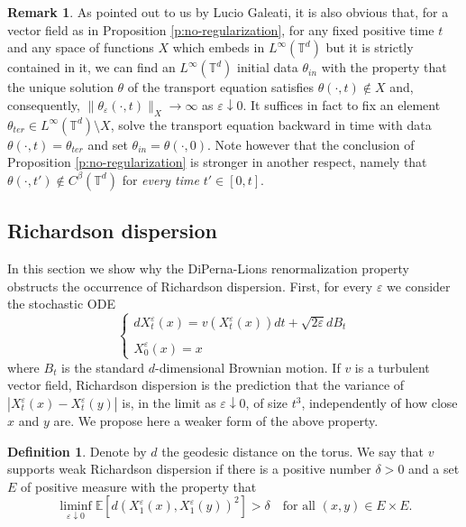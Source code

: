 \documentclass[11pt,reqno]{amsart}
\theoremstyle{definition}
\newtheorem{definition}[theorem]{Definition}
\newtheorem{remark}[theorem]{Remark}
\numberwithin{equation}{section}
\begin{document}
\begin{remark}
As pointed out to us by Lucio Galeati, it is also obvious that, for a vector field as in Proposition \ref{p:no-regularization}, for any fixed positive time $t$ and any space of functions $X$ which embeds in $L^\infty (\mathbb{T}^d)$ but it is strictly contained in it, we can find an $L^\infty (\mathbb{T}^d)$ initial data $\theta_{in}$ with the property that the unique solution $\theta$ of the transport equation satisfies $\theta (\cdot, t)\not \in X$ and, consequently, $\|\theta_\varepsilon (\cdot, t)\|_X \to \infty$ as $\varepsilon\downarrow 0$. It suffices in fact to fix an element $\theta_{ter} \in L^\infty (\mathbb{T}^d)\setminus X$, solve the transport equation backward in time with data $\theta (\cdot, t) = \theta_{ter}$ and set $\theta_{in} = \theta (\cdot, 0)$. Note however that the conclusion of Proposition \ref{p:no-regularization} is stronger in another respect, namely that $\theta (\cdot, t')\not \in C^\beta (\mathbb{T}^d)$ for {\em every time} $t' \in [0,t]$.  
\end{remark}

\subsection{Richardson dispersion}\label{s:no-richardson} In this section we show why the DiPerna-Lions renormalization property obstructs the occurrence of Richardson dispersion. First, for every $\varepsilon$ we consider the stochastic ODE
\begin{equation}\label{e:sODE}
\left\{
\begin{array}{l}
dX_t^\varepsilon (x) = v (X_t^\varepsilon (x)) dt + \sqrt{2\varepsilon} dB_t\\ \\
X_0^\varepsilon (x) =x 
\end{array}\right.
\end{equation}
where $B_t$ is the standard $d$-dimensional Brownian motion. If $v$ is a turbulent vector field, Richardson dispersion is the prediction that the variance of $|X^\varepsilon_t (x) - X^\varepsilon_t (y)|$ is, in the limit as $\varepsilon\downarrow 0$, of size $t^3$, independently of how close $x$ and $y$ are. We propose here a weaker form of the above property.

\begin{definition}\label{d:Richardson-dispersion}
Denote by $d$ the geodesic distance on the torus. We say that $v$ supports  weak Richardson dispersion if there is a positive number $\delta > 0$ and a set $E$ of positive measure with the property that
\[
\liminf_{\varepsilon\downarrow 0} \mathbb E[ d (X_1^\varepsilon (x), X_1^\varepsilon (y))^2] > \delta \quad\mbox{for all $(x,y) \in E\times E$.}
\]
\end{definition}
\end{document}
